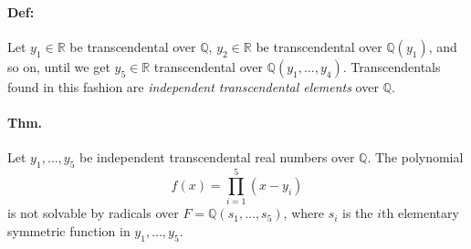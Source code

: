 \documentclass[10pt,a4paper]{article}
\begin{document}
\paragraph{Def:} Let $y_1 \in \mathbb{R}$ be transcendental over $\mathbb{Q}$, $y_2 \in\mathbb{R}$ be transcendental over $\mathbb{Q}(y_1)$, and so on, until we get $y_5 \in \mathbb{R}$ transcendental over $\mathbb{Q}(y_1, \dots, y_4)$. Transcendentals found in this fashion are \textit{independent transcendental elements} over $\mathbb{Q}$.

\paragraph{Thm.} Let $y_1, \dots, y_5$ be independent transcendental real numbers over $\mathbb{Q}$. The polynomial
$$ f(x) = \prod_{i=1}^5(x-y_i)$$
is not solvable by radicals over $F=\mathbb{Q}(s_1, \dots, s_5)$, where $s_i$ is the $i$th elementary symmetric function in $y_1, \dots, y_5$.
\end{document}
